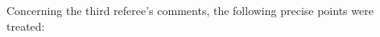 \documentclass[11pt,a4paper,sans]{moderncv}        %
\begin{document}


Concerning the third referee's comments, the following precise points were treated:


\end{document}
